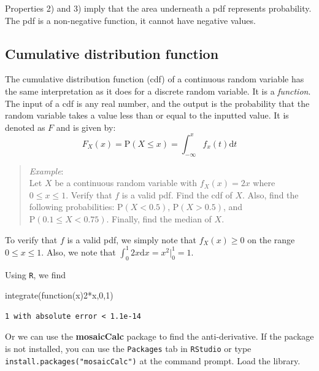 \documentclass[
  letterpaper,
  DIV=11,
  numbers=noendperiod]{scrreprt}
\newenvironment{Shaded}{\begin{snugshade}}{\end{snugshade}}
\newcommand{\ControlFlowTok}[1]{\textcolor[rgb]{0.00,0.23,0.31}{#1}}
\newcommand{\DecValTok}[1]{\textcolor[rgb]{0.68,0.00,0.00}{#1}}
\newcommand{\FunctionTok}[1]{\textcolor[rgb]{0.28,0.35,0.67}{#1}}
\newcommand{\NormalTok}[1]{\textcolor[rgb]{0.00,0.23,0.31}{#1}}
\newcommand{\SpecialCharTok}[1]{\textcolor[rgb]{0.37,0.37,0.37}{#1}}
\begin{document}
Properties 2) and 3) imply that the area underneath a pdf represents
probability. The pdf is a non-negative function, it cannot have negative
values.

\subsection{Cumulative distribution
function}\label{cumulative-distribution-function-1}

The cumulative distribution function (cdf) of a continuous random
variable has the same interpretation as it does for a discrete random
variable. It is a \emph{function}. The input of a cdf is any real
number, and the output is the probability that the random variable takes
a value less than or equal to the inputted value. It is denoted as \(F\)
and is given by: \[
F_X(x)=\mbox{P}(X\leq x)=\int_{-\infty}^x f_x(t) \mbox{d}t
\]

\begin{quote}
\emph{Example}:\\
Let \(X\) be a continuous random variable with \(f_X(x)=2x\) where
\(0 \leq x \leq 1\). Verify that \(f\) is a valid pdf. Find the cdf of
\(X\). Also, find the following probabilities: \(\mbox{P}(X<0.5)\),
\(\mbox{P}(X>0.5)\), and \(\mbox{P}(0.1\leq X < 0.75)\). Finally, find
the median of \(X\).
\end{quote}

To verify that \(f\) is a valid pdf, we simply note that
\(f_X(x) \geq 0\) on the range \(0 \leq x \leq 1\). Also, we note that
\(\int_0^1 2x \mbox{d}x = x^2\bigg|_0^1 = 1\).

Using \texttt{R}, we find

\begin{Shaded}
\begin{Highlighting}[]
\FunctionTok{integrate}\NormalTok{(}\ControlFlowTok{function}\NormalTok{(x)}\DecValTok{2}\SpecialCharTok{*}\NormalTok{x,}\DecValTok{0}\NormalTok{,}\DecValTok{1}\NormalTok{)}
\end{Highlighting}
\end{Shaded}

\begin{verbatim}
1 with absolute error < 1.1e-14
\end{verbatim}

Or we can use the \textbf{mosaicCalc} package to find the
anti-derivative. If the package is not installed, you can use the
\texttt{Packages} tab in \texttt{RStudio} or type
\texttt{install.packages("mosaicCalc")} at the command prompt. Load the
library.
\end{document}
